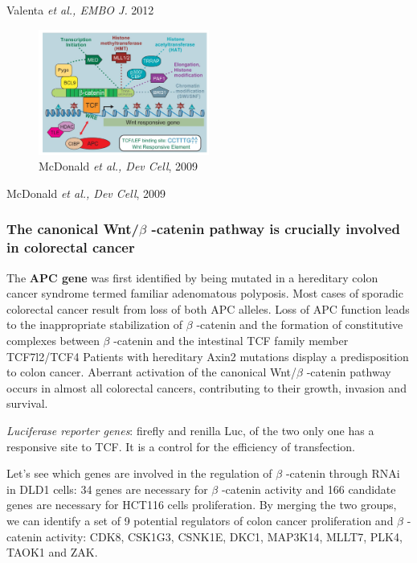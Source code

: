 Valenta \emph{et al., EMBO J.} 2012

\begin{figure}
\centering
\includegraphics[width=0.5\textwidth]{../_resources/Screenshot_2022-10-07_at_11-52-58.png}
\caption{McDonald \emph{et al., Dev Cell}, 2009}
\end{figure}

McDonald \emph{et al., Dev Cell}, 2009

\hypertarget{the-canonical-wntux3b2-catenin-pathway-is-crucially-involved-in-colorectal-cancer}{%
\subsubsection{\texorpdfstring{\textbf{The canonical Wnt/$\beta$  -catenin pathway is crucially involved in colorectal cancer}}{The canonical Wnt/$\beta$  -catenin pathway is crucially involved in colorectal cancer}}\label{the-canonical-wntux3b2-catenin-pathway-is-crucially-involved-in-colorectal-cancer}}

The \textbf{APC gene} was first identified by being mutated in a hereditary colon cancer syndrome termed familiar adenomatous polyposis. Most cases of sporadic colorectal cancer result from loss of both APC alleles. Loss of APC function leads to the inappropriate stabilization of $\beta$  -catenin and the formation of constitutive complexes between $\beta$  -catenin and the intestinal TCF family member TCF7l2/TCF4 Patients with hereditary Axin2 mutations display a predisposition to colon cancer. Aberrant activation of the canonical Wnt/$\beta$  -catenin pathway occurs in almost all colorectal cancers, contributing to their growth, invasion and survival.

\emph{Luciferase reporter genes}: firefly and renilla Luc, of the two only one has a responsive site to TCF. It is a control for the efficiency of transfection.

Let's see which genes are involved in the regulation of $\beta$  -catenin through RNAi in DLD1 cells: 34 genes are necessary for $\beta$  -catenin activity and 166 candidate genes are necessary for HCT116 cells proliferation. By merging the two groups, we can identify a set of 9 potential regulators of colon cancer proliferation and $\beta$  -catenin activity: CDK8, CSK1G3, CSNK1E, DKC1, MAP3K14, MLLT7, PLK4, TAOK1 and ZAK.

